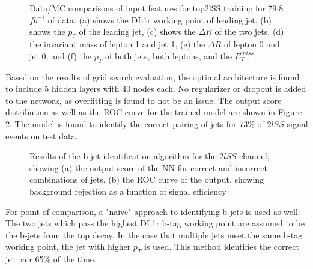 \begin{figure}[H]
    \centering
    \\
    \\
    \caption{Data/MC comparisons of input features for top2lSS training for 79.8 $fb^{-1}$ of data. (a) shows the DL1r working point of leading jet, (b) shows the $p_T$ of the leading jet, (c) shows the $\Delta R$ of the two jets, (d) the invariant mass of lepton 1 and jet 1, (e) the $\Delta R$ of lepton 0 and jet 0, and (f) the $p_T$ of both jets, both leptons, and the $E_T^{miss}$.}
    \label{fig:model_top2lSS}
\end{figure}

Based on the results of grid search evaluation, the optimal architecture is found to include 5 hidden layers with 40 nodes each. No regularizer or dropout is added to the network, as overfitting is found to not be an issue. The output score distribution as well as the ROC curve for the trained model are shown in Figure \ref{fig:top2lSSresults}. The model is found to identify the correct pairing of jets for 73\% of $2lSS$ signal events on test data.

\begin{figure}[H]
  \centering
  \label{fig:top2lSSresults}
  \caption{Results of the b-jet identification algorithm for the $2lSS$ channel, showing (a) the output score of the NN for correct and incorrect combinations of jets. (b) the ROC curve of the output, showing background rejection as a function of signal efficiency}
\end{figure}

For point of comparison, a "naive" approach to identifying b-jets is used as well: The two jets which pass the highest DL1r b-tag working point are assumed to be the b-jets from the top decay. In the case that multiple jets meet the same b-tag working point, the jet with higher $p_T$ is used. This method identifies the correct jet pair 65\% of the time. 

